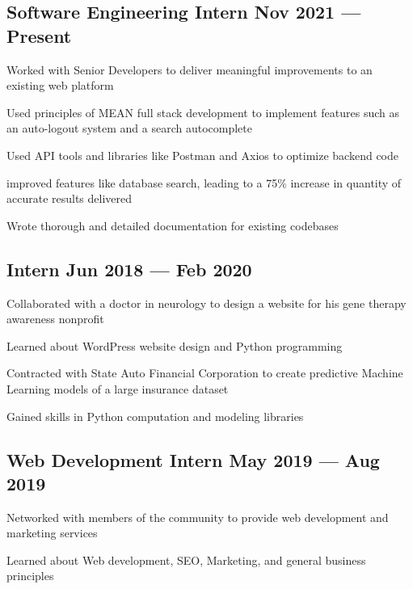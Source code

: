 \documentclass[letter,10pt]{article}
\begin{document}
\subsection{{Software Engineering Intern \hfill Nov 2021 --- Present}}
\begin{zitemize}
\item Worked with Senior Developers to deliver meaningful improvements to an existing web platform
\item Used principles of MEAN full stack development to implement features such as an auto-logout system and a search autocomplete 
\item Used API tools and libraries like Postman and Axios to optimize backend code
\item improved features like database search, leading to a 75\% increase in quantity of accurate results delivered
\item Wrote thorough and detailed documentation for existing codebases
\end{zitemize}

\subsection{{Intern \hfill Jun 2018 --- Feb 2020}}
\begin{zitemize}
\item Collaborated with a doctor in neurology to design a website for his gene therapy awareness nonprofit
\item Learned about WordPress website design and Python programming
\item Contracted with State Auto Financial Corporation to create predictive Machine Learning models of a large insurance dataset
\item Gained skills in Python computation and modeling libraries
\end{zitemize}

\subsection{{Web Development Intern \hfill May 2019 --- Aug 2019}}
\begin{zitemize}
\item Networked with members of the community to provide web development and marketing services
\item Learned about Web development, SEO, Marketing, and general business principles
\end{zitemize}
\end{document}
